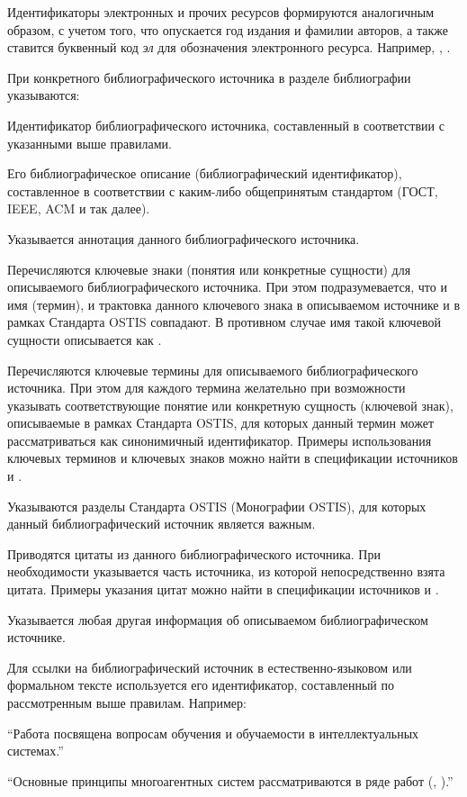 \begin{partbacktext}
Идентификаторы электронных и прочих ресурсов формируются аналогичным образом, с учетом того, что опускается год издания и фамилии авторов, а также ставится буквенный код \textit{эл} для обозначения электронного ресурса. Например, , .

При  конкретного библиографического источника в разделе библиографии указываются:

\begin{textitemize}
	\item Идентификатор библиографического источника, составленный в соответствии с указанными выше правилами.
	\item Его библиографическое описание (библиографический идентификатор), составленное в соответствии с каким-либо общепринятым стандартом (ГОСТ, IEEE, ACM и так далее).
	\item Указывается аннотация данного библиографического источника.
	\item Перечисляются ключевые знаки (понятия или конкретные сущности) для описываемого библиографического источника. При этом подразумевается, что и имя (термин), и трактовка данного ключевого знака в описываемом источнике и в рамках Стандарта OSTIS совпадают. В противном случае имя такой ключевой сущности описывается как .
	\item Перечисляются ключевые термины для описываемого библиографического источника. При этом для каждого термина желательно при возможности указывать соответствующие понятие или конкретную сущность (ключевой знак), описываемые в рамках Стандарта OSTIS, для которых данный термин может рассматриваться как синонимичный идентификатор. Примеры использования ключевых терминов и ключевых знаков можно найти в спецификации источников  и .
	\item Указываются разделы Стандарта OSTIS (Монографии OSTIS), для которых данный библиографический источник является важным.
	\item Приводятся цитаты из данного библиографического источника. При необходимости указывается часть источника, из которой непосредственно взята цитата. Примеры указания цитат можно найти в спецификации источников  и .
	\item Указывается любая другая информация об описываемом библиографическом источнике.
\end{textitemize}

Для ссылки на библиографический источник в естественно-языковом или формальном тексте используется его идентификатор, составленный по рассмотренным выше правилам. Например: 

\begin{textitemize}
	\item ``Работа  посвящена вопросам обучения и обучаемости в интеллектуальных системах.''
	\item ``Основные принципы многоагентных систем рассматриваются в ряде работ (, ).''
\end{textitemize}

\end{partbacktext}

